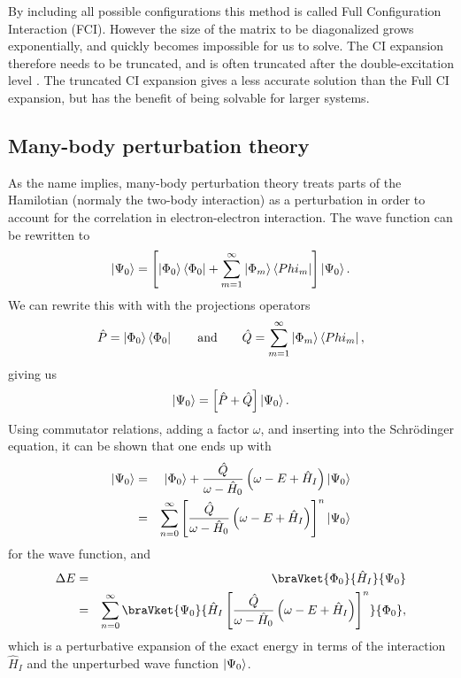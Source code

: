 		By including all possible configurations this method is called Full Configuration Interaction (FCI). However the size of the matrix to be diagonalized grows exponentially, and quickly becomes impossible for us to solve. The CI expansion therefore needs to be truncated, and is often truncated after the double-excitation level \cite{shavitt09}. The truncated CI expansion gives a less accurate solution than the Full CI expansion, but has the benefit of being solvable for larger systems.

	\subsection{Many-body perturbation theory}
		As the name implies, many-body perturbation theory treats parts of the Hamilotian (normaly the two-body interaction) as a  perturbation in order to  account for the correlation in electron-electron interaction. The wave function can be rewritten to
		\begin{equation}
			\ket{\Psi_0}=\left[ \ket{\Phi_0}\bra{\Phi_0}+\sum_{m=1}^{\infty}\ket{\Phi_m}\bra{Phi_m} \right]\ket{\Psi_0}.
		\end{equation}
		We can rewrite this with with the projections operators
		\[
			\hat{P} = \ket{\Phi_0}\bra{\Phi_0}\qquad \mbox{and} \qquad \hat{Q} = \sum_{m=1}^{\infty}\ket{\Phi_m}\bra{Phi_m},
		\]
		giving us
		\begin{equation}
			\ket{\Psi_0}=\left[ \hat{P}+\hat{Q}\right]\ket{\Psi_0}.
		\end{equation}
		Using commutator relations, adding a factor $\omega$, and inserting into the Schrödinger equation, it can be shown that one ends up with \cite{shavitt09}
		\begin{eqnarray}
			\ket{\Psi_0} & = & \ket{\Phi_0} + \frac{\hat{Q}}{\omega-\hat{H}_0}\left( \omega - E + \hat{H}_I \right)\ket{\Psi_0}\\
			& = & \sum_{n=0}^{\infty}\left[ \frac{\hat{Q}}{\omega-\hat{H}_0}\left( \omega - E + \hat{H}_I \right) \right]^{n}\ket{\Psi_0}
		\end{eqnarray}
		for the wave function, and 
		\begin{eqnarray}
			\Delta E & = &\braVket{\Phi_0}{\hat{H}_I}{\Psi_0} \\
			 & = & \sum_{n=0}^{\infty} \braVket{\Psi_0}{\hat{H}_I\left[ \frac{\hat{Q}}{\omega-\hat{H}_0}\left( \omega - E + \hat{H}_I \right) \right]^{n}}{\Phi_0},
		\end{eqnarray}
		which is a perturbative expansion of the exact energy in terms of the interaction $\hat{H}_I$ and the unperturbed wave function $\ket{\Psi_0}$.

